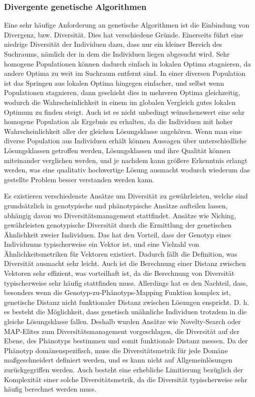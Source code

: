 \subsubsection{Divergente genetische Algorithmen}

\label{sub:divergentGeneticAlgorithms}

Eine sehr häufige Anforderung an genetische Algorithmen ist die Einbindung von Divergenz, bzw. Diversität.
Dies hat verschiedene Gründe.
Einerseits führt eine niedrige Diversität der Individuen dazu, dass nur ein kleiner Bereich des Suchraums, nämlich der in dem die Individuen liegen abgesucht wird.
Sehr homogene Populationen können dadurch einfach in lokalen Optima stagnieren, da andere Optima zu weit im Suchraum entfernt sind.
In einer diversen Population ist das Springen aus lokalen Optima hingegen einfacher, und selbst wenn Populationen stagnieren, dann geschieht dies in mehreren Optima gleichzeitig, wodurch die Wahrscheinlichkeit in einem im globalen Vergleich gutes lokalen Optimum zu finden steigt.
Auch ist es nicht unbedingt wünschenswert eine sehr homogene Population als Ergebnis zu erhalten, da die Individuen mit hoher Wahrscheinlichkeit aller der gleichen Lösungsklasse angehören.
Wenn man eine diverse Population aus Individuen erhält können Aussagen über unterschiedliche Lösungsklassen getroffen werden, Lösungsklassen und ihre Qualität können miteinander verglichen werden, und je nachdem kann größere Erkenntnis erlangt werden, was eine qualitativ hochwertige Lösung ausmacht wodurch wiederum das gestellte Problem besser verstanden werden kann.

Es existieren verschiedenste Ansätze um Diversität zu gewährleisten, welche sind grundsätzlich in genotypische und phänotypische Ansätze aufteilen lassen, abhängig davon wo Diversitätsmanagement stattfindet.
Ansätze wie Niching\cite{Shir.2012}, gewährleisten genotypische Diversität durch die Ermittlung der genetischen Ähnlichkeit zweier Individuen.
Das hat den Vorteil, dass der Genotyp eines Individuums typischerweise ein Vektor ist, und eine Vielzahl von Ähnlichkeitsmetriken für Vektoren existiert.
Dadurch fällt die Definition, was Diversität ausmacht sehr leicht.
Auch ist die Berechnung einer Distanz zwischen Vektoren sehr effizient, was vorteilhaft ist, da die Berechnung von Diversität typischerweise sehr häufig stattfinden muss.
Allerdings hat es den Nachteil, dass, besonders wenn die Genotyp-zu-Phänotyps-Mapping Funktion komplex ist, genetische Distanz nicht funktionaler Distanz zwischen Lösungen enspricht.
D. h. es besteht die Möglichkeit, dass genetisch unähnliche Individuen trotzdem in die gleiche Lösungsklasse fallen.
Deshalb wurden Ansätze wie Novelty-Search\cite{Lehman.2011} oder MAP-Elites\cite{Mouret.4202015} zum Diversitätsmanagement vorgeschlagen, die Diversität auf der Ebene, des Phänotyps bestimmen und somit funktionale Distanz messen.
Da der Phänotyp domänenspezifisch,  muss die Diversitätsmetrik für jede Domäne maßgeschneidert definiert werden, und es kann nicht auf Allgemeinlösungen zurückgegriffen werden.
Auch besteht eine erhebliche Limitierung bezüglich der Komplexität einer solche Diversitätsmetrik, da die Diversität typischerweise sehr häufig berechnet werden muss.

